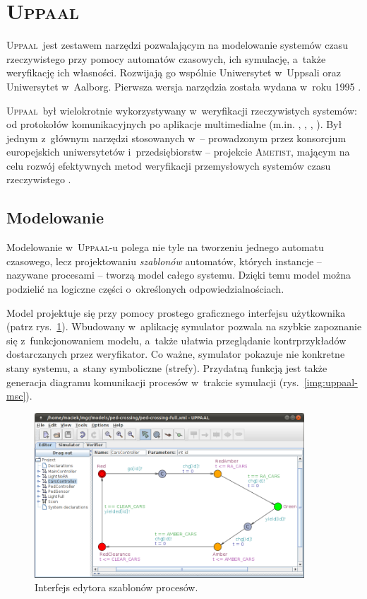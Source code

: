 \documentclass{pracamgr}
\newcommand{\upp}{\textsc{Uppaal}}
\theoremstyle{plain}
\begin{document}
\section{\upp}
\label{uppaal}

\upp\ jest zestawem narzędzi pozwalającym na modelowanie systemów czasu
rzeczywistego przy pomocy automatów czasowych, ich symulację, a~także
weryfikację ich własności. Rozwijają go wspólnie Uniwersytet w~Uppsali
oraz Uniwersytet w~Aalborg. Pierwsza wersja narzędzia została wydana w~roku
1995 \cite{lpw:fct95}.

\upp\ był wielokrotnie wykorzystywany w~weryfikacji rzeczywistych
systemów: od protokołów komunikacyjnych po aplikacje multimedialne
(m.in. \cite{lp:prfts97}, \cite{lpw:tacas98},
\cite{DBLP:conf/icfem/BordbarO03},
\cite{Ravn:2011:MVW:1987389.1987431}). Był jednym z~głównym narzędzi
stosowanych w~-- prowadzonym przez konsorcjum europejskich
uniwersytetów i~przedsiębiorstw -- projekcie \textsc{Ametist}, mającym
na celu rozwój efektywnych metod weryfikacji przemysłowych systemów czasu
rzeczywistego \cite{AMETISTfinal}.

\subsection{Modelowanie}
Modelowanie w~\upp-u polega nie tyle na tworzeniu jednego automatu
czasowego, lecz projektowaniu \emph{szablonów} automatów, których
instancje -- nazywane procesami -- tworzą model całego systemu. Dzięki
temu model można podzielić na logiczne części o~określonych
odpowiedzialnościach.

Model projektuje się przy pomocy prostego graficznego interfejsu
użytkownika (patrz rys.~\ref{img:uppaal-gui}). Wbudowany w~aplikację
symulator pozwala na szybkie zapoznanie się z~funkcjonowaniem modelu,
a~także ułatwia przeglądanie kontrprzykładów dostarczanych przez
weryfikator. Co ważne, symulator pokazuje nie konkretne stany systemu,
a~stany symboliczne (strefy). Przydatną funkcją jest także generacja
diagramu komunikacji procesów w~trakcie symulacji
(rys.~\ref{img:uppaal-msc}).
\begin{figure}
  \centering
  \includegraphics[width=0.9\textwidth]{img/uppaal-editor.png}
  \caption{Interfejs edytora szablonów procesów.}
  \label{img:uppaal-gui}
\end{figure}
\end{document}

